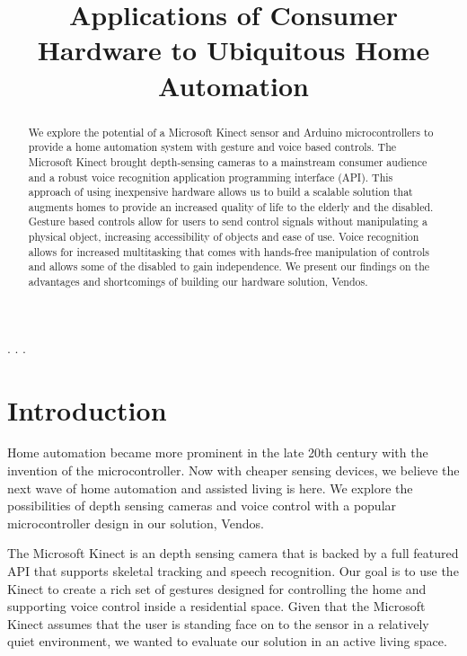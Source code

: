 \documentclass{chi-ext}
\title{Applications of Consumer Hardware to Ubiquitous Home Automation}
\author{
  \alignauthor{
  	\textbf{Kirsten Koa}\\
  	\email{kkoa@ucsd.edu}
  }\alignauthor{
  	\textbf{Chu Shao}\\
  	\email{cshao@eng.ucsd.edu}
  }
  \vfil
  \alignauthor{
  	\textbf{Derek Huynh}\\
  	\email{dbhuynh@ucsd.edu}
  }\alignauthor{
  	\textbf{Patrick Torbett}\\
  	\email{ptorbett@ucsd.edu}
  }
  \vfil
  \alignauthor{
  	\textbf{Calvin Nguyen}\\
  	\email{cbn004@ucsd.edu}
  }
}
\def\plainkeywords{automation, arduino, kinect, voice, gesture}
\begin{document}
\maketitle

\begin{abstract}
We explore the potential of a Microsoft Kinect sensor and Arduino microcontrollers to provide a home automation system with gesture and voice based controls.
The Microsoft Kinect brought depth-sensing cameras to a mainstream consumer audience and a robust voice recognition application programming interface (API).
This approach of using inexpensive hardware allows us to build a scalable solution that augments homes to provide an increased quality of life to the elderly and the disabled.
Gesture based controls allow for users to send control signals without manipulating a physical object, increasing accessibility of objects and ease of use.
Voice recognition allows for increased multitasking that comes with hands-free manipulation of controls and allows some of the disabled to gain independence.
We present our findings on the advantages and shortcomings of building our hardware solution, Vendos.
\end{abstract}

\keywords{\plainkeywords}

.
.
.


\section{Introduction}

Home automation became more prominent in the late 20th century with the invention of the microcontroller.
Now with cheaper sensing devices, we believe the next wave of home automation and assisted living is here.
We explore the possibilities of depth sensing cameras and voice control with a popular microcontroller design in our solution, Vendos.

The Microsoft Kinect is an depth sensing camera that is backed by a full featured API that supports skeletal tracking and speech recognition.
Our goal is to use the Kinect to create a rich set of gestures designed for controlling the home and supporting voice control inside a residential space.
Given that the Microsoft Kinect assumes that the user is standing face on to the sensor in a relatively quiet environment, we wanted to evaluate our solution in an active living space.
\end{document}

